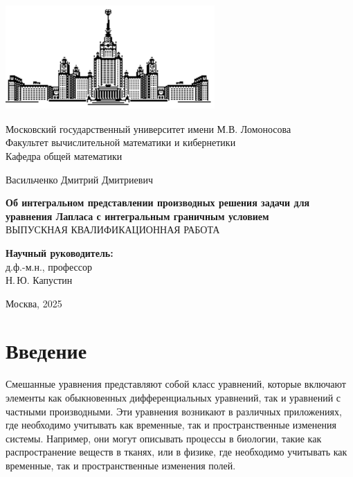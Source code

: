 \documentclass[12pt, a4paper]{article}
\begin{document}
\begin{titlepage}
\begin{center}
\includegraphics[width=8cm, height=4cm]{msu}
\end{center}
\begin{center}
Московский государственный университет имени М.В. Ломоносова\\
\vspace{0.1 cm}
Факультет вычислительной математики и кибернетики\\
\vspace{0.1 cm}
Кафедра общей математики

\vspace{3cm}
{\Large Васильченко Дмитрий Дмитриевич }\\
\vspace{1cm}

{\bf\LARGE Об интегральном представлении производных решения задачи для уравнения Лапласа с интегральным граничным условием}\\ \vspace{2cm}
ВЫПУСКНАЯ КВАЛИФИКАЦИОННАЯ РАБОТА

\end{center}
\vspace{2cm}
\begin{flushright}

{\bf Научный руководитель:}\\
д.ф.-м.н., профессор\\ 
Н.\,Ю. Капустин

\end{flushright}

 \vspace{2.0cm}

\centerline {Москва, 2025}

\end{titlepage}
\setcounter{page}{2}
\tableofcontents
\newpage
\section{Введение}
Смешанные уравнения представляют собой класс уравнений, которые включают элементы как обыкновенных дифференциальных уравнений, так и уравнений с частными производными. Эти уравнения возникают в различных приложениях, где необходимо учитывать как временные, так и пространственные изменения системы. Например, они могут описывать процессы в биологии, такие как распространение веществ в тканях, или в физике, где необходимо учитывать как временные, так и пространственные изменения полей.
\end{document}
